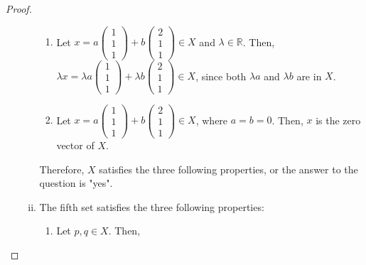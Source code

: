\begin{proof}
\begin{enumerate}[(a)]
\begin{enumerate}[(i)]
\begin{enumerate}[(1)]
            \item Let $x = a\begin{pmatrix}1\\1\\1\end{pmatrix}+b\begin{pmatrix}2\\1\\1\end{pmatrix}\in X$ and $\lambda\in\mathbb{R}$. Then, $\lambda x = \lambda a\begin{pmatrix}1\\1\\1\end{pmatrix}+\lambda b\begin{pmatrix}2\\1\\1\end{pmatrix}\in X$, since both $\lambda a$ and $\lambda b$ are in $X$.
            \item Let $x = a\begin{pmatrix}1\\1\\1\end{pmatrix}+b\begin{pmatrix}2\\1\\1\end{pmatrix}\in X$, where $a = b = 0$. Then, $x$ is the zero vector of $X$.
        \end{enumerate}
        Therefore, $X$ satisfies the three following properties, or the answer to the question is "yes".
        \item The fifth set satisfies the three following properties:
        \begin{enumerate}[(1)]
            \item Let $p, q\in X$. Then, 
        \end{enumerate}
    \end{enumerate}

\end{enumerate}
\end{proof}